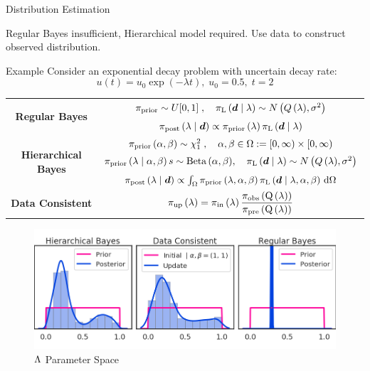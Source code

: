 \begin{block}{Distribution Estimation}
\centering
        \begin{itemize}
             Regular Bayes insufficient, Hierarchical model required.
             Use data to construct observed distribution. 
        \end{itemize}

\end{block}


\begin{block}{Example}
\centering
Consider an exponential decay problem with uncertain decay rate:
\begin{equation*}
       u(t) = u_0\exp(-\lambda t), \; u_0 = 0.5 ,\; t=2
   \end{equation*}
\vspace{-0.25cm}

\begin{tabular}{c|c}
\toprule
\multirow{2}{*}{\textbf{Regular Bayes}} & 
$\prior \sim U[0,1]\; , \quad  \likelihood\qGivelam\sim N\left(Q\lam,\sigma^2\right) $ \\
                                        & $\bayes$ \\ 
\midrule
\multirow{3}{*}{\textbf{Hierarchical Bayes}}   &
        $\prior\hyper \sim \chi^2_1\; , \quad \alpha,\beta\in\Omega :=[0,\infty)\times[0,\infty)$ \\
        & $\prior\lamGiveH s\sim \text{Beta}\hyper, \quad \likelihood\qGivelam \sim N\left(Q\lam,\sigma^2\right)$ \\
        & $\Hbayes$ \\
\midrule
\textbf{Data Consistent} &  $\dci$\\
\bottomrule
\end{tabular}
\vspace{1.cm}
\vspace{-1cm}
\begin{figure}
        \includegraphics[width=32cm]{figures/distr_EX_lambda_space.png}
        \vspace{-1cm}
        \centering
        \caption{\large $\pspace$ Parameter Space }
\end{figure}


\end{block}
